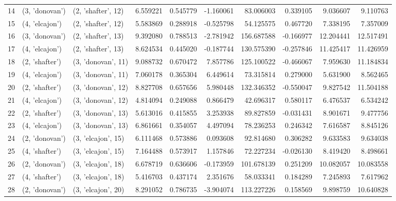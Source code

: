 \begin{tabular}{lllrrrrrrr}
14 &   (3, 'donovan') &  (2, 'shafter', 12) &   6.559221 &   0.545779 &  -1.160061 &   83.006003 &  0.339105 &   9.036607 &   9.110763 \\
15 &   (4, 'elcajon') &  (2, 'shafter', 12) &   5.583869 &   0.288918 &  -0.525798 &   54.125575 &  0.467720 &   7.338195 &   7.357009 \\
16 &   (3, 'donovan') &  (2, 'shafter', 13) &   9.392080 &   0.788513 &  -2.781942 &  156.687588 & -0.166977 &  12.204441 &  12.517491 \\
17 &   (4, 'elcajon') &  (2, 'shafter', 13) &   8.624534 &   0.445020 &  -0.187744 &  130.575390 & -0.257846 &  11.425417 &  11.426959 \\
18 &   (2, 'shafter') &  (3, 'donovan', 11) &   9.088732 &   0.670472 &   7.857786 &  125.100522 & -0.466067 &   7.959630 &  11.184834 \\
19 &   (4, 'elcajon') &  (3, 'donovan', 11) &   7.060178 &   0.365304 &   6.449614 &   73.315814 &  0.279000 &   5.631900 &   8.562465 \\
20 &   (2, 'shafter') &  (3, 'donovan', 12) &   8.827708 &   0.657656 &   5.980448 &  132.346352 & -0.550047 &   9.827542 &  11.504188 \\
21 &   (4, 'elcajon') &  (3, 'donovan', 12) &   4.814094 &   0.249088 &   0.866479 &   42.696317 &  0.580117 &   6.476537 &   6.534242 \\
22 &   (2, 'shafter') &  (3, 'donovan', 13) &   5.613016 &   0.415855 &   3.253938 &   89.827859 & -0.031431 &   8.901671 &   9.477756 \\
23 &   (4, 'elcajon') &  (3, 'donovan', 13) &   6.861661 &   0.354057 &   4.497094 &   78.236253 &  0.246342 &   7.616587 &   8.845126 \\
24 &   (2, 'donovan') &  (3, 'elcajon', 15) &   6.111468 &   0.573886 &   0.093608 &   92.814680 &  0.306282 &   9.633583 &   9.634038 \\
25 &   (4, 'shafter') &  (3, 'elcajon', 15) &   7.164488 &   0.573917 &   1.157846 &   72.227234 & -0.026130 &   8.419420 &   8.498661 \\
26 &   (2, 'donovan') &  (3, 'elcajon', 18) &   6.678719 &   0.636606 &  -0.173959 &  101.678139 &  0.251209 &  10.082057 &  10.083558 \\
27 &   (4, 'shafter') &  (3, 'elcajon', 18) &   5.416703 &   0.437174 &   2.351676 &   58.033341 &  0.184289 &   7.245893 &   7.617962 \\
28 &   (2, 'donovan') &  (3, 'elcajon', 20) &   8.291052 &   0.786735 &  -3.904074 &  113.227226 &  0.158569 &   9.898759 &  10.640828 \\

\end{tabular}

